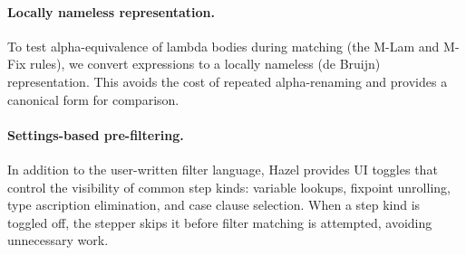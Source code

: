 \paragraph{Locally nameless representation.}
To test alpha-equivalence of lambda bodies during matching (the
M-Lam and M-Fix rules), we convert expressions to a locally nameless
(de Bruijn) representation. This avoids the cost of repeated
alpha-renaming and provides a canonical form for comparison.

\paragraph{Settings-based pre-filtering.}
In addition to the user-written filter language, Hazel provides UI
toggles that control the visibility of common step kinds: variable
lookups, fixpoint unrolling, type ascription elimination, and case
clause selection. When a step kind is toggled off, the stepper skips
it before filter matching is attempted, avoiding unnecessary work.

